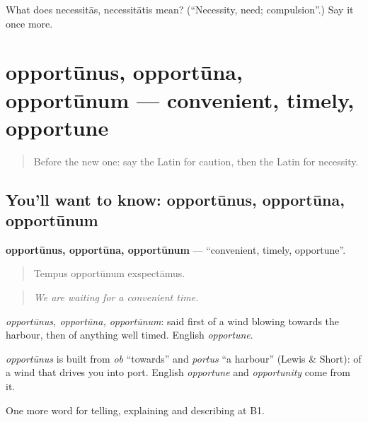 \begin{tcolorbox}[breakable,colback=teal!4,colframe=teal!35!black,title={Before you move on}]
What does necessitās, necessitātis mean? (\textquotedblleft{}Necessity, need; compulsion\textquotedblright{}.) Say it once more.
\end{tcolorbox}
\section[opportūnus, opportūna, opportūnum]{opportūnus, opportūna, opportūnum — convenient, timely, opportune}

\label{lesson:LA-C392-opportunus}



\begin{quote}
Before the new one: say the Latin for caution, then the Latin for necessity.
\end{quote}

\subsection*{You'll want to know: opportūnus, opportūna, opportūnum}
\textbf{opportūnus, opportūna, opportūnum} — \textquotedblleft{}convenient, timely, opportune\textquotedblright{}.

\begin{quote}
Tempus opportūnum exspectāmus.
\end{quote}

\begin{quote}
\emph{We are waiting for a convenient time.}
\end{quote}

\emph{opportūnus, opportūna, opportūnum}: said first of a wind blowing towards the harbour, then of anything well timed. English \emph{opportune}.

\begin{cousinweb}
\emph{opportūnus} is built from \emph{ob} \textquotedblleft{}towards\textquotedblright{} and \emph{portus} \textquotedblleft{}a harbour\textquotedblright{} (Lewis \& Short): of a wind that drives you into port. English \emph{opportune} and \emph{opportunity} come from it.
\end{cousinweb}

\begin{grammarlens}[title={What you've built}]
One more word for telling, explaining and describing at B1.
\end{grammarlens}

